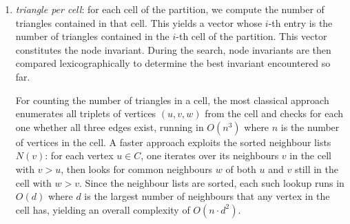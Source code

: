 \begin{enumerate}
  \item \textit{triangle per cell}: for each cell of the partition, we compute the number of triangles contained in that cell. This yields a vector whose $i$-th entry is the number of triangles contained in the $i$-th cell of the partition. This vector constitutes the node invariant. During the search, node invariants are then compared lexicographically to determine the best invariant encountered so far.
  
  \vspace{0.5em}
  \noindent{}

  For counting the number of triangles in a cell, the most classical approach enumerates all triplets of vertices $(u, v, w)$ from the cell and checks for each one whether all three edges exist, running in $O(n^3)$ where $n$ is the number of vertices in the cell. A faster approach exploits the sorted neighbour lists $N(v)$: for each vertex $u \in C$, one iterates over its neighbours $v$ in the cell with $v > u$, then looks for common neighbours $w$ of both $u$ and $v$ still in the cell with $w > v$. Since the neighbour lists are sorted, each such lookup runs in $O(d)$ where $d$ is the largest number of neighbours that any vertex in the cell has, yielding an overall complexity of $O(n \cdot d^2)$. 


\end{enumerate}
